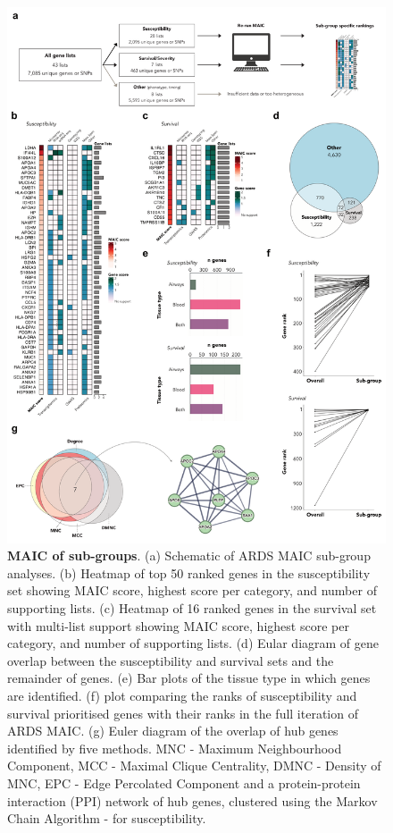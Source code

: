 \documentclass[
  11,
  a4paper,
]{article}
\begin{document}
\begin{figure}

{\centering \includegraphics{./img/Figure_4.png}

}

\caption{\label{fig-fig4}\textbf{MAIC of sub-groups}. (a) Schematic of
ARDS MAIC sub-group analyses. (b) Heatmap of top 50 ranked genes in the
susceptibility set showing MAIC score, highest score per category, and
number of supporting lists. (c) Heatmap of 16 ranked genes in the
survival set with multi-list support showing MAIC score, highest score
per category, and number of supporting lists. (d) Eular diagram of gene
overlap between the susceptibility and survival sets and the remainder
of genes. (e) Bar plots of the tissue type in which genes are
identified. (f) plot comparing the ranks of susceptibility and survival
prioritised genes with their ranks in the full iteration of ARDS MAIC.
(g) Euler diagram of the overlap of hub genes identified by five
methods. MNC - Maximum Neighbourhood Component, MCC - Maximal Clique
Centrality, DMNC - Density of MNC, EPC - Edge Percolated Component and a
protein-protein interaction (PPI) network of hub genes, clustered using
the Markov Chain Algorithm - for susceptibility.}

\end{figure}
\end{document}
